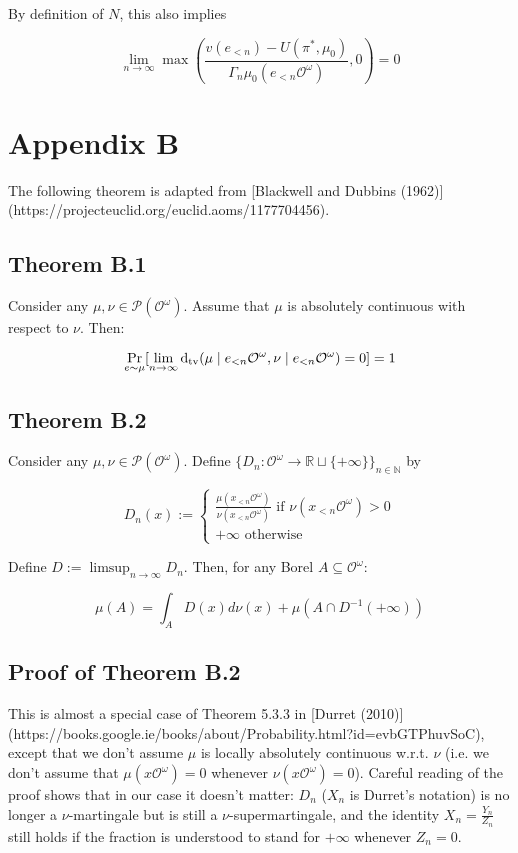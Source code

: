 \documentclass[a4paper]{article}
\DeclareMathOperator{\Prb}{Pr}
\newcommand{\Dtv}{\operatorname{d}_{\textnormal{tv}}}
\newcommand{\Nats}{\mathbb{N}}
\newcommand{\Reals}{\mathbb{R}}
\newcommand{\Prob}{\mathcal{P}}
\newcommand{\Obs}{\mathcal{O}}
\newcommand{\ObsO}{\Obs^\omega}
\begin{document}
By definition of ${N}$, this also implies

$$\lim_{n \rightarrow \infty} \max(\frac{v(e_{<n}) - U(\pi^*,\mu_0)}{\Gamma_n \mu_0(e_{<n}\ObsO)},0) = 0 $$

\section{Appendix B}

The following theorem is adapted from [Blackwell and Dubbins (1962)](https://projecteuclid.org/euclid.aoms/1177704456).

\subsection{Theorem B.1}

Consider any ${\mu, \nu \in \Prob(\ObsO)}$. Assume that ${\mu}$ is absolutely continuous with respect to ${\nu}$. Then:

$$\Prb_{e \sim \mu}[\lim_{n \rightarrow \infty} \Dtv(\mu \mid e_{<n}\ObsO, \nu \mid e_{<n}\ObsO) = 0] = 1$$

\subsection{Theorem B.2}

Consider any ${\mu, \nu \in \Prob(\ObsO)}$. Define ${\{D_n: \ObsO \rightarrow \Reals \sqcup \{+\infty\}\}_{n \in \Nats}}$ by

$$D_n(x):=\begin{cases}\frac{\mu(x_{<n}\ObsO)}{\nu(x_{<n}\ObsO)} \text{ if } \nu(x_{<n}\ObsO) > 0\\+\infty \text{ otherwise}\end{cases}$$

Define ${D:= \limsup_{n \rightarrow \infty} D_n}$. Then, for any Borel ${A \subseteq \ObsO}$:

$$\mu(A) = \int_A D(x) d\nu(x) + \mu(A \cap D^{-1}(+\infty))$$

\subsection{Proof of Theorem B.2}

This is almost a special case of Theorem 5.3.3 in [Durret (2010)](https://books.google.ie/books/about/Probability.html?id=evbGTPhuvSoC), except that we don't assume ${\mu}$ is locally absolutely continuous w.r.t. ${\nu}$ (i.e. we don't assume that ${\mu(x\ObsO)=0}$ whenever ${\nu(x\ObsO)=0}$). Careful reading of the proof shows that in our case it doesn't matter: ${D_n}$ (${X_n}$ is Durret's notation) is no longer a ${\nu}$-martingale but is still a ${\nu}$-supermartingale, and the identity ${X_n = \frac{Y_n}{Z_n}}$ still holds if the fraction is understood to stand for ${+\infty}$ whenever ${Z_n = 0}$.
\end{document}
